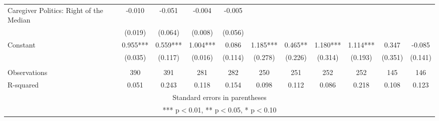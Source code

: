 \begin{tabular}{lcccccccccc}
Caregiver Politics: Right of the Median & -0.010 & -0.051 & -0.004 & -0.005 &  &  &  &  &  &  \\
 & (0.019) & (0.064) & (0.008) & (0.056) &  &  &  &  &  &  \\
Constant & 0.955*** & 0.559*** & 1.004*** & 0.086 & 1.185*** & 0.465** & 1.180*** & 1.114*** & 0.347 & -0.085 \\
 & (0.035) & (0.117) & (0.016) & (0.114) & (0.278) & (0.226) & (0.314) & (0.193) & (0.351) & (0.141) \\
 &  &  &  &  &  &  &  &  &  &  \\
Observations & 390 & 391 & 281 & 282 & 250 & 251 & 252 & 252 & 145 & 146 \\
 R-squared & 0.051 & 0.243 & 0.118 & 0.154 & 0.098 & 0.112 & 0.086 & 0.218 & 0.108 & 0.123 \\ \hline
\multicolumn{11}{c}{ Standard errors in parentheses} \\
\multicolumn{11}{c}{ *** p$<$0.01, ** p$<$0.05, * p$<$0.10} \\
\end{tabular}
